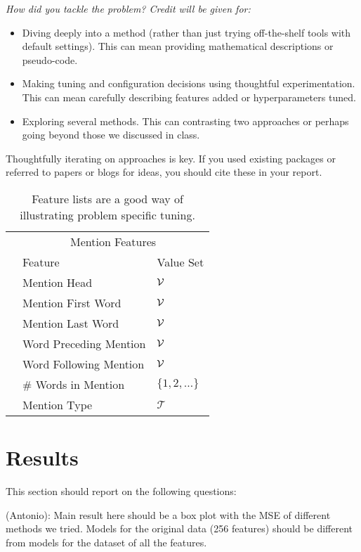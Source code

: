 \documentclass[11pt]{article}
\begin{document}
{\itshape
How did you tackle the problem? Credit will be given for:

  \begin{itemize}
  \item Diving deeply into a method (rather than just trying
    off-the-shelf tools with default settings). This can mean 
    providing mathematical descriptions or pseudo-code.
  \item Making tuning and configuration decisions using thoughtful experimentation.  
    This can mean carefully describing features added or hyperparameters tuned.
  \item Exploring several methods. This can contrasting two approaches
    or perhaps going beyond those we discussed in class.
  \end{itemize}

  \noindent Thoughtfully iterating on approaches is key.
  If you used existing packages or referred to papers or blogs for ideas,
  you should cite these in your report. 

  \begin{table}
    \centering
    \begin{tabular}{@{}lll@{}}
      &\multicolumn{2}{c}{Mention Features  } \\
      & Feature & Value Set\\
      \midrule
      & Mention Head & $\mathcal{V}$ \\
      & Mention First Word & $\mathcal{V}$ \\
      & Mention Last Word & $\mathcal{V}$ \\
      & Word Preceding Mention & $\mathcal{V}$ \\
      & Word Following Mention & $\mathcal{V}$\\
      & \# Words in Mention & $\{1, 2, \ldots \}$ \\
      & Mention Type & $\mathcal{T}$ \\
      \bottomrule
      
    \end{tabular}
    \caption{Feature lists are a good way of illustrating problem specific tuning.}
  \end{table}

}

\section{Results}
This section should report on the following questions: 

(Antonio): Main result here should be a box plot with the MSE of different methods we tried. Models for the original data (256 features) should be different from models for the dataset of all the features.
\end{document}
